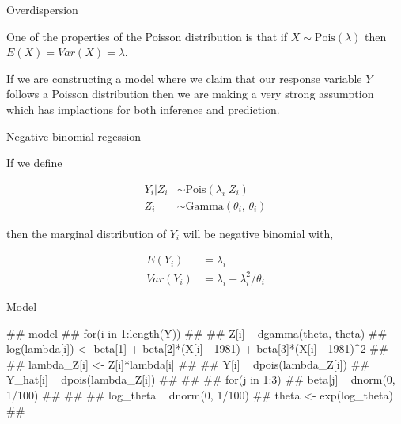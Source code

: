 \documentclass[11pt,ignorenonframetext,]{beamer}
\newenvironment{Shaded}{}{}
\newcommand{\KeywordTok}[1]{\textcolor[rgb]{0.00,0.44,0.13}{\textbf{{#1}}}}
\newcommand{\NormalTok}[1]{{#1}}
\let\oldShaded\Shaded
\let\endoldShaded\endShaded
\renewenvironment{Shaded}{\footnotesize\begin{spacing}{0.9}\oldShaded}{\endoldShaded\end{spacing}}
\let\oldverbatim\verbatim
\let\endoldverbatim\endverbatim
\renewenvironment{verbatim}{\footnotesize\begin{spacing}{0.9}\oldverbatim}{\endoldverbatim\end{spacing}}
\begin{document}
\begin{frame}[fragile]{Overdispersion}

One of the properties of the Poisson distribution is that if
\(X \sim \text{Pois}(\lambda)\) then \(E(X) = Var(X) = \lambda\).

If we are constructing a model where we claim that our response variable
\(Y\) follows a Poisson distribution then we are making a very strong
assumption which has implactions for both inference and prediction.

\pause

\begin{Shaded}
\end{Shaded}

\end{frame}

\begin{frame}{Negative binomial regession}

If we define

\[
\begin{aligned}
Y_i|Z_i &\sim \text{Pois}(\lambda_i \; Z_i) \\
Z_i &\sim \text{Gamma}(\theta_i, \, \theta_i)
\end{aligned}
\]

then the marginal distribution of \(Y_i\) will be negative binomial
with,

\[
\begin{aligned}
E(Y_i)   &= \lambda_i \\
Var(Y_i) &= \lambda_i + \lambda_i^2/\theta_i
\end{aligned}
\]

\end{frame}

\begin{frame}[fragile]{Model}

\begin{verbatim}
## model{
##   for(i in 1:length(Y))
##   {
##     Z[i] ~ dgamma(theta, theta)
##     log(lambda[i]) <- beta[1] + beta[2]*(X[i] - 1981) + beta[3]*(X[i] - 1981)^2
## 
##     lambda_Z[i] <- Z[i]*lambda[i]
## 
##     Y[i] ~ dpois(lambda_Z[i])
##     Y_hat[i] ~ dpois(lambda_Z[i])
##   }
## 
##   for(j in 1:3){
##     beta[j] ~ dnorm(0, 1/100)
##   }
## 
##   log_theta ~ dnorm(0, 1/100)
##   theta <- exp(log_theta)
## }
\end{verbatim}

\end{frame}
\end{document}
